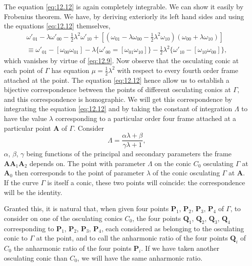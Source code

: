 \documentclass[leqno,11pt]{book}
\numberwithin{equation}{chapter}
\theoremstyle{shape1}
\theoremstyle{shapesmall}
\begin{document}
The equation \eqref{eq:12.12} is again completely integrable. We can show it easily by Frobenius theorem. We have, by deriving exteriorly its left hand sides and using the equations \eqref{eq:12.12} themselves,
\[
\begin{multlined}
  \omega'_{01}-\lambda\omega'_{00}-\frac{1}{2}\lambda^{2}\omega'_{10}+\left[\left(\omega_{01}-\lambda\omega_{00}-\frac{1}{2}\lambda^{2}\omega_{10}\right)(\omega_{00}+\lambda\omega_{10})\right]\\
  \equiv\omega'_{01}-[\omega_{00}\omega_{01}]-\lambda\{\omega'_{00}=[\omega_{01}\omega_{10}]\}-\frac{1}{2}\lambda^{2}\{\omega'_{10}-[\omega_{10}\omega_{00}]\},
\end{multlined}
\]
which vanishes by virtue of \eqref{eq:12.9}. Now observe that the osculating conic at each point of $\Gamma$ has equation $\mu=\frac{1}{2}\lambda^{2}$ with respect to every fourth order frame attached at the point. The equation \eqref{eq:12.12} hence allow us to establish a bijective correspondence between the points of different osculating conics at $\Gamma$, and this correspondence is homographic. We will get this correspondence by integrating the equation \eqref{eq:12.12} and by taking the constant of integration $\Lambda$ to have the value $\lambda$ corresponding to a particular order four frame attached at a particular point $\mathbf{A}$ of $\Gamma$. Consider
\begin{equation}
  \label{eq:12.13}
  \Lambda=\frac{\alpha\lambda+\beta}{\gamma\lambda+1},
\end{equation}
$\alpha$, $\beta$, $\gamma$ being functions of the principal and secondary parameters the frame $\mathbf{AA}_{1}\mathbf{A}_{2}$ depends on. The point with parameter $\Lambda$ on the conic $C_{0}$ osculating $\Gamma$ at $\mathbf{A}_{0}$ then corresponds to the point of parameter $\lambda$ of the conic osculating $\Gamma$ at $\mathbf{A}$. If the curve $\Gamma$ is itself a conic, these two points will coincide: the correspondence will be the identity.

Granted this, it is natural that, when given four points $\mathbf{P}_{1}$, $\mathbf{P}_{2}$, $\mathbf{P}_{3}$, $\mathbf{P}_{4}$ of $\Gamma$, to consider on one of the osculating conics $C_{0}$, the four points $\mathbf{Q}_{1}$, $\mathbf{Q}_{2}$, $\mathbf{Q}_{3}$, $\mathbf{Q}_{4}$ corresponding to $\mathbf{P}_{1}$, $\mathbf{P}_{2}$, $\mathbf{P}_{3}$, $\mathbf{P}_{4}$, each considered as belonging to the osculating conic to $\Gamma$ at the point, and to call the anharmonic ratio of the four points $\mathbf{Q}_{i}$ of $C_{0}$ the anharmonic ratio of the four points $\mathbf{P}_{i}$. If we have taken another osculating conic than $C_{0}$, we will have the same anharmonic ratio.
\end{document}
